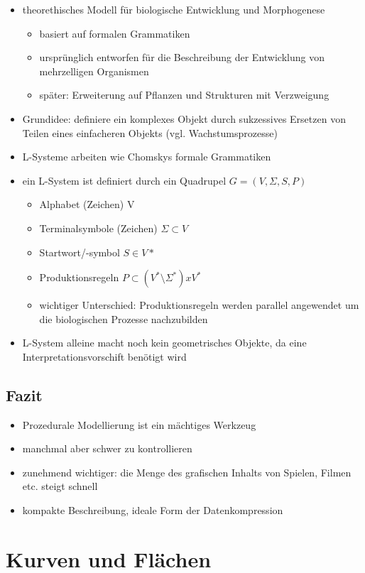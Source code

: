 \documentclass[paper=a4, fontsize=11pt]{scrartcl} %
\numberwithin{equation}{section} %
\numberwithin{figure}{section} %
\numberwithin{table}{section} %
\begin{document}
\begin{itemize}
\item theorethisches Modell für biologische Entwicklung und Morphogenese 
\begin{itemize}
\item basiert auf formalen Grammatiken
\item ursprünglich entworfen für die Beschreibung der Entwicklung von mehrzelligen Organismen
\item später: Erweiterung auf Pflanzen und Strukturen mit Verzweigung
\end{itemize}
\item Grundidee: definiere ein komplexes Objekt durch sukzessives Ersetzen von Teilen eines einfacheren Objekts (vgl. Wachstumsprozesse)
\item L-Systeme arbeiten wie Chomskys formale Grammatiken
\item ein L-System ist definiert durch ein Quadrupel $G = (V, \Sigma, S, P)$
\begin{itemize}
\item Alphabet (Zeichen) V
\item Terminalsymbole (Zeichen) $\Sigma \subset V$
\item Startwort/-symbol $S \in V*$
\item Produktionsregeln $P \subset (V^* \setminus \Sigma^*) x V^*$
\item wichtiger Unterschied: Produktionsregeln werden parallel angewendet um die biologischen Prozesse nachzubilden
\end{itemize}
\item L-System alleine macht noch kein geometrisches Objekte, da eine Interpretationsvorschift benötigt wird
\end{itemize}

\subsection{Fazit}
\begin{itemize}
\item Prozedurale Modellierung ist ein mächtiges Werkzeug
\item manchmal aber schwer zu kontrollieren
\item zunehmend wichtiger: die Menge des grafischen Inhalts von Spielen, Filmen etc. steigt schnell
\item kompakte Beschreibung, ideale Form der \glqq Datenkompression\grqq
\end{itemize}
\newpage
\section{Kurven und Flächen}
\end{document}
